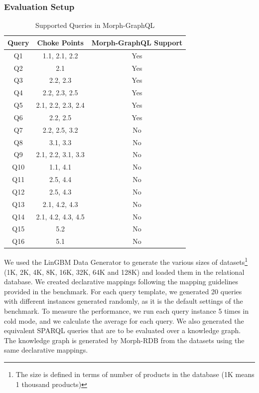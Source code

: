 \subsubsection{Evaluation Setup}
\begin{table}[!ht]
 \centering
  \caption[Morph-GraphQL supported LinGBM queries]{Supported Queries in Morph-GraphQL}
 \label{table:supported-queries}
  \begin{tabular}{c | c | c} 
  \toprule
   Query & Choke Points & Morph-GraphQL Support  \\
 \midrule
  Q1 & 1.1, 2.1, 2.2 & Yes   \\ 
  Q2 & 2.1 & Yes  \\
  Q3 & 2.2, 2.3 & Yes   \\
  Q4 & 2.2, 2.3, 2.5 & Yes  \\
  Q5 & 2.1, 2.2, 2.3, 2.4 & Yes  \\ 
  Q6 & 2.2, 2.5 & Yes   \\ 
  Q7 & 2.2, 2.5, 3.2 & No    \\ 
  Q8 & 3.1, 3.3 & No    \\ 
  Q9 & 2.1, 2.2, 3.1, 3.3 & No    \\ 
  Q10 & 1.1, 4.1 & No   \\ 
  Q11 & 2.5, 4.4 & No   \\ 
  Q12 & 2.5, 4.3 & No   \\ 
  Q13 & 2.1, 4.2, 4.3 & No   \\ 
  Q14 & 2.1, 4.2, 4.3, 4.5 & No   \\ 
  Q15 & 5.2 & No   \\ 
  Q16 & 5.1 & No   \\ 
  \bottomrule
  \end{tabular}
 
 \end{table}
We used the LinGBM Data Generator to generate the various sizes of datasets\footnote{The size is defined in terms of number of products in the database (1K means 1 thousand products)} (1K, 2K, 4K, 8K, 16K, 32K, 64K and 128K) and loaded them in the relational database. We created declarative mappings following the mapping guidelines provided in the benchmark. For each query template, we generated 20 queries with different instances generated randomly, as it is the default settings of the benchmark. To measure the performance, we run each query instance 5 times in cold mode, and we calculate the average for each query. We also generated the equivalent SPARQL queries that are to be evaluated over a knowledge graph. The knowledge graph is generated by Morph-RDB \citep{priyatna2014formalisation} from the datasets using the same declarative mappings. 
